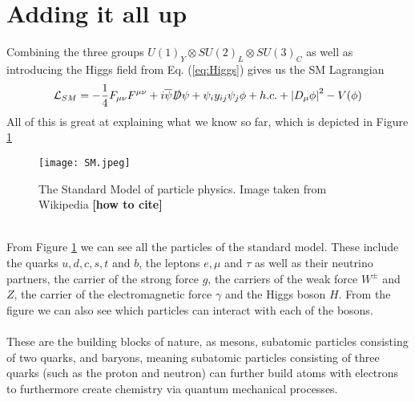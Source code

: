 \documentclass[12pt, a4paper]{book}
\begin{document}
\section{Adding it all up}
Combining the three groups $U(1)_Y\otimes SU(2)_L\otimes SU(3)_C$ as well as introducing the Higgs field from Eq. (\ref{eq:Higgs}) gives us the SM Lagrangian
$$
    \mathcal{L}_{SM} = -\frac{1}{4}F_{\mu\nu}F^{\mu\nu} + i\overline{\psi}\slashed{D}\psi + \psi_iy_{ij}\psi_j\phi + h.c. + \abs{D_\mu\phi}^2 - V(\phi)
$$
All of this is great at explaining what we know so far, which is depicted in Figure \ref{fig:SM}
\begin{figure}[!ht]
    \centering
    \texttt{[image: SM.jpeg]}
    \caption[The Standard Model]{The Standard Model of particle physics. Image taken from Wikipedia \textbf{[how to cite]}}\label{fig:SM}
\end{figure}
\\From Figure \ref{fig:SM} we can see all the particles of the standard model. These include the quarks $u,d,c,s,t$ and $b$, the leptons $e,\mu$ and $\tau$ as well as their neutrino partners, the carrier of the strong force $g$, the carriers of the weak force $W^\pm$ and $Z$, 
the carrier of the electromagnetic force $\gamma$ and the Higgs boson $H$. From the figure we can also see which particles can interact with each of the bosons. \\
\\These are the building blocks of nature, as mesons, subatomic particles consisting of two quarks, and baryons, meaning subatomic particles consisting of three quarks (such as the proton and neutron) can further build atoms with electrons to furthermore create chemistry via 
quantum mechanical processes. 
\end{document}
